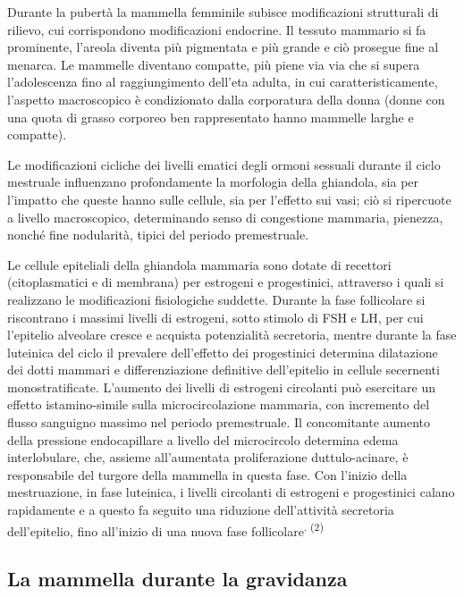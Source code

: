 \documentclass[]{article}
\begin{document}
Durante la pubertà la mammella femminile subisce modificazioni
strutturali di rilievo, cui corrispondono modificazioni endocrine. Il
tessuto mammario si fa prominente, l'areola diventa più pigmentata e più
grande e ciò prosegue fine al menarca. Le mammelle diventano compatte,
più piene via via che si supera l'adolescenza fino al raggiungimento
dell'eta adulta, in cui caratteristicamente, l'aspetto macroscopico è
condizionato dalla corporatura della donna (donne con una quota di
grasso corporeo ben rappresentato hanno mammelle larghe e compatte).

Le modificazioni cicliche dei livelli ematici degli ormoni sessuali
durante il ciclo mestruale influenzano profondamente la morfologia della
ghiandola, sia per l'impatto che queste hanno sulle cellule, sia per
l'effetto sui vasi; ciò si ripercuote a livello macroscopico,
determinando senso di congestione mammaria, pienezza, nonché fine
nodularità, tipici del periodo premestruale.

Le cellule epiteliali della ghiandola mammaria sono dotate di recettori
(citoplasmatici e di membrana) per estrogeni e progestinici, attraverso
i quali si realizzano le modificazioni fisiologiche suddette. Durante la
fase follicolare si riscontrano i massimi livelli di estrogeni, sotto
stimolo di FSH e LH, per cui l'epitelio alveolare cresce e acquista
potenzialità secretoria, mentre durante la fase luteinica del ciclo il
prevalere dell'effetto dei progestinici determina dilatazione dei dotti
mammari e differenziazione definitive dell'epitelio in cellule
secernenti monostratificate. L'aumento dei livelli di estrogeni
circolanti può esercitare un effetto istamino-simile sulla
microcircolazione mammaria, con incremento del flusso sanguigno massimo
nel periodo premestruale. Il concomitante aumento della pressione
endocapillare a livello del microcircolo determina edema interlobulare,
che, assieme all'aumentata proliferazione duttulo-acinare, è
responsabile del turgore della mammella in questa fase. Con l'inizio
della mestruazione, in fase luteinica, i livelli circolanti di estrogeni
e progestinici calano rapidamente e a questo fa seguito una riduzione
dell'attività secretoria dell'epitelio, fino all'inizio di una nuova
fase follicolare\textsuperscript{. (2) }

\hypertarget{la-mammella-durante-la-gravidanza}{%
\subsection{La mammella durante la
gravidanza}\label{la-mammella-durante-la-gravidanza}}
\end{document}
